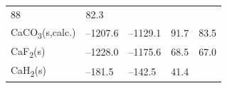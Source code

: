 \documentclass[
  9pt,
]{extbook}
\theoremstyle{definition}
\theoremstyle{definition}
\theoremstyle{definition}
\theoremstyle{remark}
\begin{document}
\begin{longtable}[]{@{}lllll@{}}
\begin{minipage}[t]{0.18\columnwidth}
88\strut
\end{minipage} & \begin{minipage}[t]{0.18\columnwidth}\raggedright
82.3\strut
\end{minipage}\tabularnewline
\begin{minipage}[t]{0.10\columnwidth}\raggedright
CaCO\textsubscript{3}(s,calc.)\strut
\end{minipage} & \begin{minipage}[t]{0.19\columnwidth}\raggedright
--1207.6\strut
\end{minipage} & \begin{minipage}[t]{0.20\columnwidth}\raggedright
--1129.1\strut
\end{minipage} & \begin{minipage}[t]{0.18\columnwidth}\raggedright
91.7\strut
\end{minipage} & \begin{minipage}[t]{0.18\columnwidth}\raggedright
83.5\strut
\end{minipage}\tabularnewline
\begin{minipage}[t]{0.10\columnwidth}\raggedright
CaF\textsubscript{2}(s)\strut
\end{minipage} & \begin{minipage}[t]{0.19\columnwidth}\raggedright
--1228.0\strut
\end{minipage} & \begin{minipage}[t]{0.20\columnwidth}\raggedright
--1175.6\strut
\end{minipage} & \begin{minipage}[t]{0.18\columnwidth}\raggedright
68.5\strut
\end{minipage} & \begin{minipage}[t]{0.18\columnwidth}\raggedright
67.0\strut
\end{minipage}\tabularnewline
\begin{minipage}[t]{0.10\columnwidth}\raggedright
CaH\textsubscript{2}(s)\strut
\end{minipage} & \begin{minipage}[t]{0.19\columnwidth}\raggedright
--181.5\strut
\end{minipage} & \begin{minipage}[t]{0.20\columnwidth}\raggedright
--142.5\strut
\end{minipage} & \begin{minipage}[t]{0.18\columnwidth}\raggedright
41.4\strut
\end{minipage} & \begin{minipage}[t]{0.18\columnwidth}\raggedright

\end{minipage}
\end{longtable}
\end{document}
